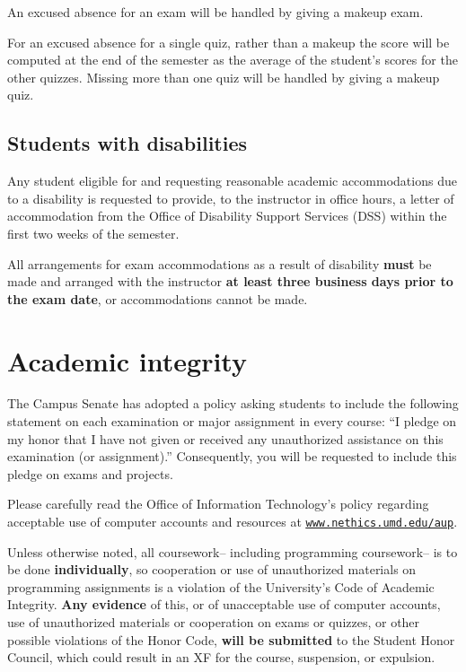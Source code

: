 \documentclass[10pt]{article}
\begin{document}
      An excused absence for an exam will be handled by giving a makeup
    exam.

      For an excused absence for a single quiz, rather than a makeup the score
    will be computed at the end of the semester as the average of the
    student's scores for the other quizzes.  Missing more than one quiz will
    be handled by giving a makeup quiz.

    \subsection{Students with disabilities}

      Any student eligible for and requesting reasonable academic
    accommodations due to a disability is requested to provide, to the
    instructor in office hours, a letter of accommodation from the Office of
    Disability Support Services (DSS) within the first two weeks of the
    semester.

      All arrangements for exam accommodations as a result of disability
    \textbf{must} be made and arranged with the instructor \textbf{at least
    three business days prior to the exam date}, or accommodations cannot
    be made.

  \section{Academic integrity}

    The Campus Senate has adopted a policy asking students to include the
  following statement on each examination or major assignment in every
  course: ``I pledge on my honor that I have not given or received any
  unauthorized assistance on this examination (or assignment).''
  Consequently, you will be requested to include this pledge on exams and
  projects.

    Please carefully read the Office of Information Technology's policy
  regarding acceptable use of computer accounts and resources at
    \href{http://www.nethics.umd.edu/aup}
         {\texttt{\underline{www.nethics.umd.edu/aup}}}.

    Unless otherwise noted, all coursework-- including programming
  coursework-- is to be done \textbf{individually}, so cooperation or use of
  unauthorized materials on programming assignments is a violation of the
  University's Code of Academic Integrity.  \textbf{Any evidence} of this,
  or of unacceptable use of computer accounts, use of unauthorized materials
  or cooperation on exams or quizzes, or other possible violations of the
  Honor Code, \textbf{will be submitted} to the Student Honor Council, which
  could result in an XF for the course, suspension, or expulsion.
\end{document}
